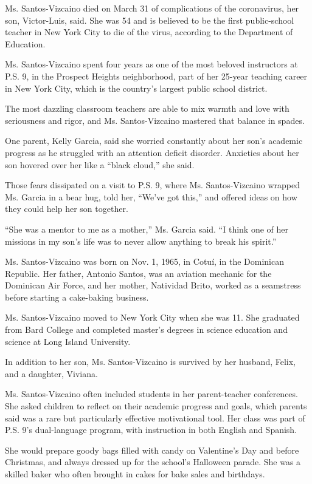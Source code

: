 Ms. Santos-Vizcaino died on March 31 of complications of the
coronavirus, her son, Victor-Luis, said. She was 54 and is believed to
be the first public-school teacher in New York City to die of the virus,
according to the Department of Education.

Ms. Santos-Vizcaino spent four years as one of the most beloved
instructors at P.S. 9, in the Prospect Heights neighborhood, part of her
25-year teaching career in New York City, which is the country's largest
public school district.

The most dazzling classroom teachers are able to mix warmth and love
with seriousness and rigor, and Ms. Santos-Vizcaino mastered that
balance in spades.

One parent, Kelly Garcia, said she worried constantly about her son's
academic progress as he struggled with an attention deficit disorder.
Anxieties about her son hovered over her like a ``black cloud,'' she
said.

Those fears dissipated on a visit to P.S. 9, where Ms. Santos-Vizcaino
wrapped Ms. Garcia in a bear hug, told her, ``We've got this,'' and
offered ideas on how they could help her son together.

``She was a mentor to me as a mother,'' Ms. Garcia said. ``I think one
of her missions in my son's life was to never allow anything to break
his spirit.''

Ms. Santos-Vizcaino was born on Nov. 1, 1965, in Cotuí, in the Dominican
Republic. Her father, Antonio Santos, was an aviation mechanic for the
Dominican Air Force, and her mother, Natividad Brito, worked as a
seamstress before starting a cake-baking business.

Ms. Santos-Vizcaino moved to New York City when she was 11. She
graduated from Bard College and completed master's degrees in science
education and science at Long Island University.

In addition to her son, Ms. Santos-Vizcaino is survived by her husband,
Felix, and a daughter, Viviana.

Ms. Santos-Vizcaino often included students in her parent-teacher
conferences. She asked children to reflect on their academic progress
and goals, which parents said was a rare but particularly effective
motivational tool. Her class was part of P.S. 9's dual-language program,
with instruction in both English and Spanish.

She would prepare goody bags filled with candy on Valentine's Day and
before Christmas, and always dressed up for the school's Halloween
parade. She was a skilled baker who often brought in cakes for bake
sales and birthdays.

